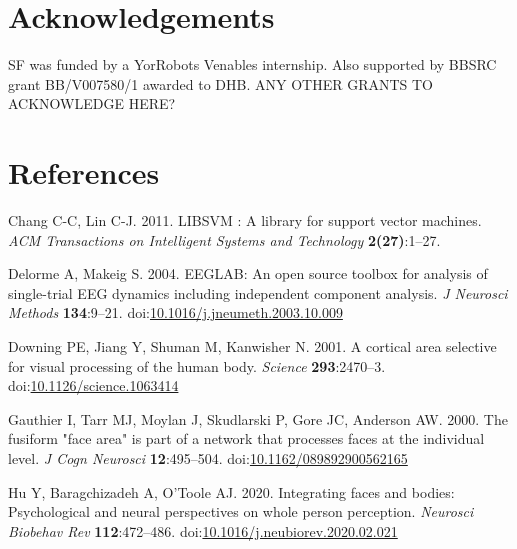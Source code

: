 \documentclass[
]{article}
\newlength{\cslhangindent}
\newlength{\cslentryspacingunit} %
\newenvironment{CSLReferences}[2] %
 {%
  \setlength{\parindent}{0pt}
  \ifodd #1
  \let\oldpar\par
  \def\par{\hangindent=\cslhangindent\oldpar}
  \fi
  \setlength{\parskip}{#2\cslentryspacingunit}
 }%
 {}
\begin{document}
\hypertarget{acknowledgements}{%
\section{Acknowledgements}\label{acknowledgements}}

SF was funded by a YorRobots Venables internship. Also supported by BBSRC grant BB/V007580/1 awarded to DHB. ANY OTHER GRANTS TO ACKNOWLEDGE HERE?

\hypertarget{references}{%
\section*{References}\label{references}}

\hypertarget{refs}{}
\begin{CSLReferences}{1}{0}
\leavevmode{}%
Chang C-C, Lin C-J. 2011. {LIBSVM} : A library for support vector machines. \emph{ACM Transactions on Intelligent Systems and Technology} \textbf{2(27)}:1--27.

\leavevmode{}%
Delorme A, Makeig S. 2004. {EEGLAB}: An open source toolbox for analysis of single-trial {EEG} dynamics including independent component analysis. \emph{J Neurosci Methods} \textbf{134}:9--21. doi:\href{https://doi.org/10.1016/j.jneumeth.2003.10.009}{10.1016/j.jneumeth.2003.10.009}

\leavevmode{}%
Downing PE, Jiang Y, Shuman M, Kanwisher N. 2001. A cortical area selective for visual processing of the human body. \emph{Science} \textbf{293}:2470--3. doi:\href{https://doi.org/10.1126/science.1063414}{10.1126/science.1063414}

\leavevmode{}%
Gauthier I, Tarr MJ, Moylan J, Skudlarski P, Gore JC, Anderson AW. 2000. The fusiform "face area" is part of a network that processes faces at the individual level. \emph{J Cogn Neurosci} \textbf{12}:495--504. doi:\href{https://doi.org/10.1162/089892900562165}{10.1162/089892900562165}

\leavevmode{}%
Hu Y, Baragchizadeh A, O'Toole AJ. 2020. Integrating faces and bodies: Psychological and neural perspectives on whole person perception. \emph{Neurosci Biobehav Rev} \textbf{112}:472--486. doi:\href{https://doi.org/10.1016/j.neubiorev.2020.02.021}{10.1016/j.neubiorev.2020.02.021}


\end{CSLReferences}
\end{document}
